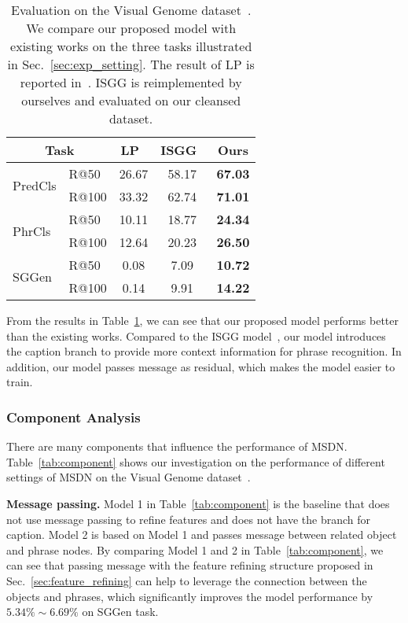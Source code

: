 \begin{table}[h]
	\small
\begin{center}
		\begin{tabular}{l  l ||  c c c  }
			\multicolumn{2}{c}{Task} & LP~\cite{visual_relationship}  & ISGG~\cite{xu2017scene}  & Ours  \\ \hline\hline
			\multirow{2}{*}{PredCls}     &R@50  & 26.67  & 58.17       &\textbf{67.03} \\
			&R@100  & 33.32 & 62.74        &  \textbf{71.01}      \\\hline
			\multirow{2}{*}{PhrCls}      &R@50& 10.11   & 18.77       &  \textbf{24.34}      \\
			&R@100 &  12.64  & 20.23      &  \textbf{26.50}\\\hline
			\multirow{2}{*}{SGGen}      &R@50& 0.08    & 7.09        &  \textbf{10.72}     \\
			&R@100 & 0.14    & 9.91      &  \textbf{14.22}      \\
			\hline
		\end{tabular}
\end{center}
	\caption{Evaluation on the Visual Genome
		dataset~\cite{visual_genome}. We compare our proposed model with existing works on the three tasks illustrated in Sec.~\ref{sec:exp_setting}. The result of LP is reported in~\cite{xu2017scene}. ISGG is reimplemented by ourselves and evaluated on our cleansed dataset. }
	\label{table:vg_eval}
\end{table}


From the results in Table~\ref{table:vg_eval}, we can see that our proposed model performs better than the existing works. Compared to the ISGG model~\cite{xu2017scene}, our model introduces the caption branch to provide more context information for phrase recognition. In addition, our model passes message as residual, which makes the model easier to train. 


\subsubsection{Component Analysis}

There are many components that influence the performance of MSDN. Table~\ref{tab:component} shows our investigation on the performance of different settings of MSDN on the Visual Genome dataset~\cite{visual_genome}.

\textbf{Message passing.} Model 1 in Table~\ref{tab:component} is the baseline that does not use message passing to refine features and does not have the branch for caption. Model 2 is based on Model 1 and passes message between related object and phrase nodes. By comparing Model 1 and 2 in Table~\ref{tab:component}, we can see that passing message with the feature refining structure  proposed in Sec.~\ref{sec:feature_refining} can help to leverage the connection between the objects and phrases, which significantly improves the model performance by $5.34\%\sim 6.69\%$ on SGGen task. 

